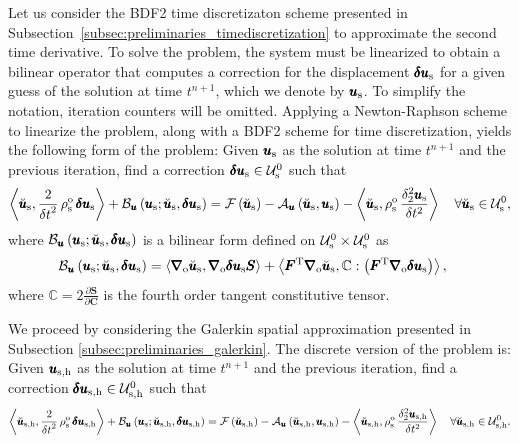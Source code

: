 \documentclass[11pt,english]{article}
\def\usolid{\pmb{u}_{\rm{s}}}                   %
\def\testusolid{\breve{\pmb{u}}_{\rm{s}}}       %
\def\testusolidspace{\mathcal{U}_{\rm{s}}^0}    %
\def\usolidinc{\pmb{\delta u}_{\rm{s}}}                   %
\def\usolidh{\pmb{u}_{\rm{s},\rm{h}}}                    %
\def\testusolidh{\breve{\pmb{u}}_{\rm{s},\rm{h}}}       %
\def\usolidinch{\pmb{\delta u}_{\rm{s},\rm{h}}}           %
\def\testusolidspaceh{\mathcal{U}_{\rm{s},\rm{h}}^{0}}    %
\def\u{{\pmb u}}                            %
\def\C{\pmb{C}}                             %
\def\PK{\pmb{S}}                            %
\def\Ftrans{\pmb{F}^{\rm{T}}}               %
\def\grad{\pmb{\nabla}_{\rm{o}}}        %
\def\denssolid{\rho_{\rm{s}}^{\rm{o}}}  %
\def\dt{{\delta t}}                                     %
\def\BDFdudt2{\frac{\delta_2^2 \usolid}{\delta t^2}}    %
\def\BDFduhdt2{\frac{\delta_2^2 \usolidh}{\delta t^2}}    %
\begin{document}
Let us consider the BDF2 time discretizaton scheme presented in Subsection~\ref{subsec:preliminaries_timediscretization} to approximate the second time derivative. To solve the problem, the system must be linearized to obtain a bilinear operator that computes a correction for the displacement $\usolidinc$ for a given guess of the solution at time $t^{n+1}$, which we denote by $\usolid$. To simplify the notation, iteration counters will be omitted. Applying a Newton-Raphson scheme to linearize the problem, along with a BDF2 scheme for time discretization, yields the following form of the problem: Given $\usolid$ as the solution at time $t^{n+1}$ and  the previous iteration, find a correction $\usolidinc \in \testusolidspace$ such that
\begin{equation*}
    \left \langle \testusolid , \frac{2}{\dt^2}\, \denssolid \, \usolidinc \right \rangle + \mathcal{B}_\u \left ( \usolid;\testusolid, \usolidinc \right) = \mathcal{F} \left ( \testusolid  \right) -  \mathcal{A}_\u \left ( \testusolid , \usolid \right) - \left \langle \testusolid, \denssolid \, \BDFdudt2 \right \rangle \quad \forall \testusolid \in \testusolidspace,
\end{equation*}
where $\mathcal{B}_\u \left ( \usolid;\testusolid, \usolidinc \right)$ is a bilinear form defined on $\testusolidspace \times \testusolidspace$ as
\begin{alignat*}{1}
    \mathcal{B}_\u \left ( \usolid; \testusolid, \usolidinc \right) 
    &= \left \langle \grad \testusolid , \grad \usolidinc \PK \right \rangle 
    + \left \langle \Ftrans \grad \testusolid ,  \mathbb{C} : \left (\Ftrans \grad \usolidinc \right ) \right \rangle,
\end{alignat*}
where $\mathbb{C} = 2\frac{\partial \PK}{\partial \C}$ is the fourth order tangent constitutive tensor. 

We proceed by considering the Galerkin spatial approximation presented in Subsection \ref{subsec:preliminaries_galerkin}. The discrete version of the problem is: Given $\usolidh$ as the solution at time $t^{n+1}$ and  the previous iteration, find a correction $\usolidinch \in \testusolidspaceh$ such that
\begin{equation*}
    \left \langle \testusolidh , \frac{2}{\dt^2}\, \denssolid \, \usolidinch \right \rangle + \mathcal{B}_\u \left ( \usolid; \testusolidh, \usolidinch \right) = \mathcal{F} \left ( \testusolidh  \right) -  \mathcal{A}_\u \left ( \testusolidh , \usolidh \right) - \left \langle \testusolidh, \denssolid \, \BDFduhdt2 \right \rangle \quad \forall \testusolidh \in \testusolidspaceh.
\end{equation*}
\end{document}
